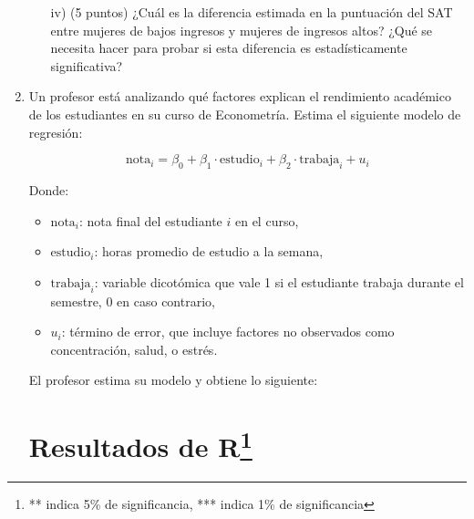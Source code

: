 \documentclass[10pt,a4paper]{article}
\begin{document}
\begin{enumerate}
\begin{enumerate}
    \item[iv)] (5 puntos) ¿Cuál es la diferencia estimada en la puntuación del SAT entre mujeres de bajos ingresos y mujeres de ingresos altos? ¿Qué se necesita hacer para probar si esta diferencia es estadísticamente significativa?
\end{enumerate}


\item Un profesor está analizando qué factores explican el rendimiento académico de los estudiantes en su curso de Econometría. Estima el siguiente modelo de regresión:

\[
\text{nota}_i = \beta_0 + \beta_1 \cdot \text{estudio}_i + \beta_2 \cdot \text{trabaja}_i + u_i
\]

Donde:
\begin{itemize}
    \item $\text{nota}_i$: nota final del estudiante \(i\) en el curso,
    \item $\text{estudio}_i$: horas promedio de estudio a la semana,
    \item $\text{trabaja}_i$: variable dicotómica que vale 1 si el estudiante trabaja durante el semestre, 0 en caso contrario,
    \item $u_i$: término de error, que incluye factores no observados como concentración, salud, o estrés.
\end{itemize}

El profesor estima su modelo y obtiene lo siguiente: %

\section*{Resultados de R\footnote{  ** indica 5\% de significancia, *** indica 1\% de significancia}}

\noindent{}
\end{enumerate}
\end{document}
